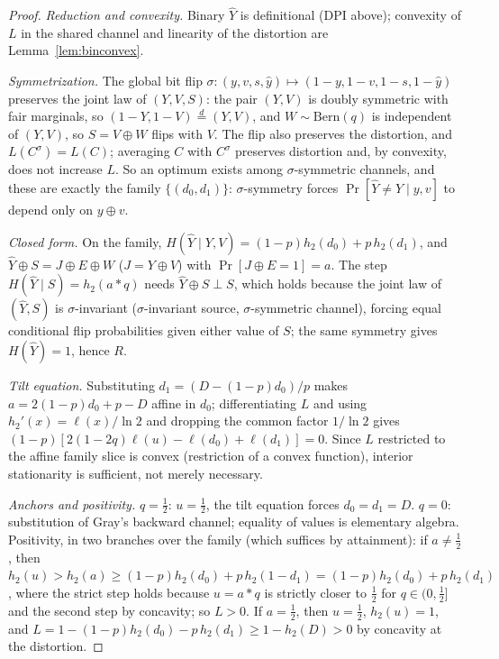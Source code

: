 \documentclass[11pt,onecolumn]{IEEEtran}
\newcommand{\hY}{\widehat{Y}}
\begin{document}
\begin{proof}
\emph{Reduction and convexity.} Binary $\hY$ is definitional (DPI
above); convexity of $L$ in the shared channel and linearity of the
distortion are Lemma~\ref{lem:binconvex}.

\emph{Symmetrization.} The global bit flip
$\sigma:(y,v,s,\hat y)\mapsto(1{-}y,1{-}v,1{-}s,1{-}\hat y)$ preserves
the joint law of $(Y,V,S)$: the pair $(Y,V)$ is doubly symmetric with
fair marginals, so $(1{-}Y,1{-}V)\overset{d}=(Y,V)$, and $W\sim
\mathrm{Bern}(q)$ is independent of $(Y,V)$, so $S=V\oplus W$ flips
with $V$. The flip also preserves the distortion, and
$L(C^\sigma)=L(C)$;
averaging $C$ with $C^\sigma$ preserves distortion and, by convexity,
does not increase $L$. So an optimum exists among $\sigma$-symmetric
channels, and these are exactly the family $\{(d_0,d_1)\}$:
$\sigma$-symmetry forces $\Pr[\hY\ne Y\mid y,v]$ to depend only on
$y\oplus v$.

\emph{Closed form.} On the family, $H(\hY\mid Y,V)=
(1-p)h_2(d_0)+p\,h_2(d_1)$, and $\hY\oplus S=J\oplus E\oplus W$
($J=Y\oplus V$) with $\Pr[J\oplus E=1]=a$. The step
$H(\hY\mid S)=h_2(a*q)$ needs $\hY\oplus S\perp S$, which holds
because the joint law of $(\hY,S)$ is $\sigma$-invariant
($\sigma$-invariant source, $\sigma$-symmetric channel), forcing equal
conditional flip probabilities given either value of $S$; the same
symmetry gives $H(\hY)=1$, hence $R$.

\emph{Tilt equation.} Substituting $d_1=(D-(1-p)d_0)/p$ makes
$a=2(1-p)d_0+p-D$ affine in $d_0$; differentiating $L$ and using
$h_2'(x)=\ell(x)/\ln2$ and dropping the common factor $1/\ln2$ gives
$(1-p)[2(1-2q)\ell(u)-\ell(d_0)+\ell(d_1)]=0$. Since $L$ restricted to
the affine family slice is convex (restriction of a convex function),
interior stationarity is sufficient, not merely necessary.

\emph{Anchors and positivity.} $q=\tfrac12$: $u=\tfrac12$, the tilt
equation forces $d_0=d_1=D$. $q=0$: substitution of Gray's backward
channel; equality of values is elementary algebra. Positivity, in two
branches over the family (which suffices by attainment): if
$a\ne\tfrac12$, then $h_2(u)>h_2(a)\ge(1-p)h_2(d_0)+p\,h_2(1-d_1)
=(1-p)h_2(d_0)+p\,h_2(d_1)$, where the strict step holds because $u=a*q$
is strictly closer to $\tfrac12$ for $q\in(0,\tfrac12]$ and the second
step by concavity; so $L>0$. If $a=\tfrac12$, then $u=\tfrac12$,
$h_2(u)=1$, and $L=1-(1-p)h_2(d_0)-p\,h_2(d_1)\ge1-h_2(D)>0$ by
concavity at the distortion.
\end{proof}
\end{document}
